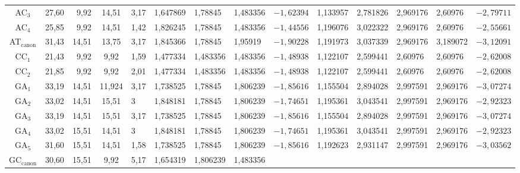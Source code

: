 \begin{table}
{\begin{sideways}
\begin{tabular}{|c|c|r|c|l|l|l|l|l|c|l|l|l|l|}
AC$_3$ &27,60&9,92&14,51&3,17&1,647869&1,78845&1,483356&$-


1{,}62394$&1,133957&2,781826&2,969176&2,60976&$-2{,}79711$\\


AC$_4$ &25,85&9,92&14,51&1,42&1,826245&1,78845&1,483356&


$-1{,}44556$&1,196076&3,022322&2,969176&2,60976&$-2{,}55661$\\


AT$_{\mathrm{canon}}$ &31,43&14,51&13,75&3,17&1,845366&1,78845&1,95919&


$-1{,}90228$&1,191973&3,037339&2,969176&3,189072&$-3{,}12091$\\


CC$_1$&21,43&9,92&\hphantom{9}9,92&1,59&1,477334&1,483356&1,483356&$-


1{,}48938$&1,122107&2,599441&2,60976&2,60976&$-2{,}62008$\\


CC$_2$&21,85&9,92&\hphantom{9}9,92&2,01&1,477334&1,483356&1,483356&$-


1{,}48938$&1,122107&2,599441&2,60976&2,60976&$-2{,}62008$\\


GA$_1$ &33,19&14,51&11,924&3,17&1,738525&1,78845&1,806239&


$-1{,}85616$&1,155504&2,894028&2,997591&2,969176&$-3{,}07274$\\


GA$_2$&33,02&14,51&15,51&3&1,848181&1,78845&1,806239&$-


1{,}74651$&1,195361&3,043541&2,997591&2,969176&$-2{,}92323$\\


GA$_3$ &33,19&14,51&15,51&3,17&1,738525&1,78845&1,806239&


$-1{,}85616$&1,155504&2,894028&2,997591&2,969176&$-3{,}07274$\\


GA$_4$&33,02&15,51&14,51&3&1,848181&1,78845&1,806239&$-


1{,}74651$&1,195361&3,043541&2,997591&2,969176&$-2{,}92323$\\


GA$_5$&31,60&15,51&14,51&1,58&1,738525&1,78845&1,806239&


$-1{,}85616$&1,192623&2,931147&2,997591&2,969176&$-3{,}03562$\\


GC$_{\mathrm{canon}}$&30,60&15,51&\hphantom{9}9,92&5,17&1,654319&1,806239&1,483356&



\end{tabular}
\end{sideways}}
\end{table}
